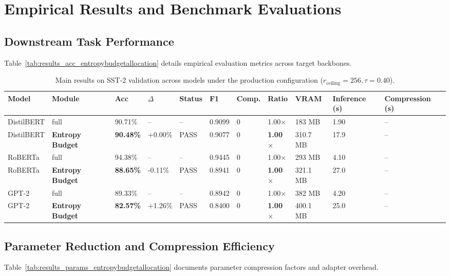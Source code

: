 \section{Empirical Results and Benchmark Evaluations}

\subsection{Downstream Task Performance}
Table~\ref{tab:results_acc_entropybudgetallocation} details empirical evaluation metrics across target backbones.

\begin{table}[t]
\centering
\small
\begin{tabular}{lllllllllll}
\toprule
\textbf{Model} & \textbf{Module} & \textbf{Acc} & \textbf{$\Delta$} & \textbf{Status} & \textbf{F1} & \textbf{Comp.} & \textbf{Ratio} & \textbf{VRAM} & \textbf{Inference (s)} & \textbf{Compression (s)} \\
\midrule
DistilBERT & full & 90.71\% & -- & -- & 0.9099 & 0 & 1.00$\times$ & 183 MB & 1.90 & -- \\
DistilBERT & \textbf{Entropy Budget} & \textbf{90.48\%} & +0.00\% & PASS & 0.9077 & 0 & \textbf{1.00$\times$} & 310.7 MB & 17.9 & -- \\
RoBERTa & full & 94.38\% & -- & -- & 0.9445 & 0 & 1.00$\times$ & 293 MB & 4.10 & -- \\
RoBERTa & \textbf{Entropy Budget} & \textbf{88.65\%} & -0.11\% & PASS & 0.8941 & 0 & \textbf{1.00$\times$} & 321.1 MB & 27.0 & -- \\
GPT-2 & full & 89.33\% & -- & -- & 0.8942 & 0 & 1.00$\times$ & 382 MB & 4.20 & -- \\
GPT-2 & \textbf{Entropy Budget} & \textbf{82.57\%} & +1.26\% & PASS & 0.8400 & 0 & \textbf{1.00$\times$} & 400.1 MB & 25.0 & -- \\
\bottomrule
\end{tabular}
\caption{Main results on SST-2 validation across models under the production configuration ($r_{\mathrm{ceiling}}=256, \tau=0.40$).}
\label{tab:main_sst2}
\end{table}

\subsection{Parameter Reduction and Compression Efficiency}
Table~\ref{tab:results_params_entropybudgetallocation} documents parameter compression factors and adapter overhead.

